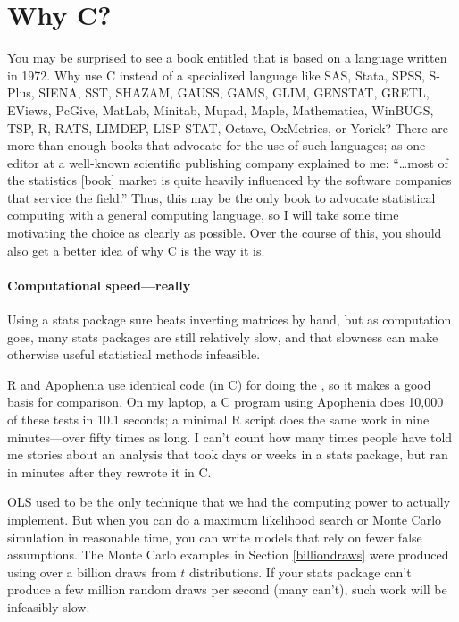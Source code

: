 \section{Why C?}
You may be surprised to see a book entitled  that is based on a language written in 1972. 
Why use C instead of a specialized language like SAS, Stata, SPSS,
S-Plus, SIENA, SST, SHAZAM, GAUSS, GAMS, GLIM, GENSTAT, GRETL, EViews,
PcGive, MatLab, Minitab, Mupad, Maple, Mathematica, WinBUGS, TSP, R,
RATS, LIMDEP, LISP-STAT, Octave, OxMetrics, or Yorick?  There are more
than enough books that advocate for the use of such languages; as one
editor at a well-known scientific publishing company explained to me:
``\dots most of the statistics [book] market is quite heavily influenced
by the software companies that service the field.''  Thus, this may be
the only book to advocate statistical computing with a general computing
language, so I will take some time motivating the choice as clearly as
possible. Over the course of this, you should also get a better idea of
why C is the way it is.

\paragraph{Computational speed---really} Using a stats package sure
beats inverting matrices by hand, but as computation goes, many stats
packages are still relatively slow, and that slowness can make otherwise
useful statistical methods infeasible.

R and Apophenia use identical code (in C) for doing the , so it makes a good basis for comparison.  On my laptop,
a C program using Apophenia does 10,000 of these tests in 10.1 seconds;
a minimal R script does the same work in nine minutes---over fifty
times as long. I can't count how many times people have told me stories
about an analysis that took days or weeks in a stats package, but ran
in minutes after they rewrote it in C.

OLS used to be the only technique that we had the computing power to
actually implement. But when you can do a maximum likelihood search
or Monte Carlo simulation in reasonable time, you can write models
that rely on fewer false assumptions. The Monte Carlo examples in Section
\ref{billiondraws} were produced using over a billion draws from $t$
distributions. If your stats package can't produce a few million random
draws per second (many can't), such work will be infeasibly slow.

